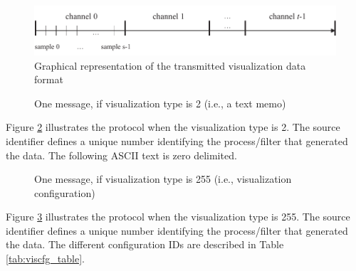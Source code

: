 \documentclass[letterpaper,oneside,12pt]{book}
\begin{document}
\begin{figure}[ht]
 \centerline{\includegraphics{figures/visualization_type1}}
 \caption{Graphical representation of the transmitted visualization data format}
 \label{visualization_type1}
\end{figure}

\begin{figure}[ht]
 \centerline{}
 \caption{One message, if visualization type is 2 (i.e., a text memo)}
 \label{visualizationprotocol_type2}
\end{figure}

Figure \ref{visualizationprotocol_type2} illustrates the protocol when the 
visualization type is 2. The source identifier defines a unique number 
identifying the process/filter that generated the data. The following ASCII
text is zero delimited.

\begin{figure}[ht]
 \centerline{}
 \caption{One message, if visualization type is 255 (i.e., visualization configuration)}
 \label{visualizationprotocol_type255}
\end{figure}

Figure \ref{visualizationprotocol_type255} illustrates the protocol when the 
visualization type is 255. The source identifier defines a unique number 
identifying the process/filter that generated the data. The different 
configuration IDs are described in Table \ref{tab:viscfg_table}.
\end{document}
